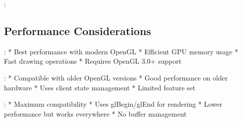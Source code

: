 \documentclass[a4paper,10pt,english,openany,oneside]{sphinxmanual}
\begin{document}
\sphinxAtStartPar
{}:

\begin{sphinxVerbatim}[commandchars=\\\{\}]
      
   
   
   
\end{sphinxVerbatim}


\subsection{Performance Considerations}
\label{\detokenize{api/buffers:performance-considerations}}
\sphinxAtStartPar
{}:
* Best performance with modern OpenGL
* Efficient GPU memory usage
* Fast drawing operations
* Requires OpenGL 3.0+ support

\sphinxAtStartPar
{}:
* Compatible with older OpenGL versions
* Good performance on older hardware
* Uses client state management
* Limited feature set

\sphinxAtStartPar
{}:
* Maximum compatibility
* Uses glBegin/glEnd for rendering
* Lower performance but works everywhere
* No buffer management
\end{document}
